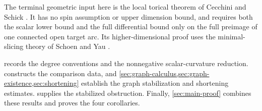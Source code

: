 The terminal geometric input here is the local torical theorem of Cecchini
and Schick \cite[Theorem~1.14(1)]{CecchiniSchick2021}. It has no spin assumption
or upper dimension bound, and requires both the scalar lower bound and the
full differential bound only on the full preimage of one connected open target
arc. Its higher-dimensional proof uses the minimal-slicing theory of Schoen
and Yau \cite{SchoenYau2017}.

 records the degree conventions and the nonnegative
scalar-curvature reduction.  constructs the comparison
data, and \cref{sec:graph-calculus,sec:graph-existence,sec:shortening}
establish the graph stabilization and shortening estimates.
 supplies the stabilized obstruction.
Finally, \cref{sec:main-proof} combines these results and proves the four
corollaries.

